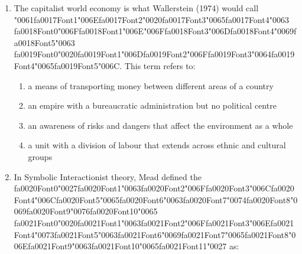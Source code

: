 \documentclass[12pt]{article}
\begin{document}
\begin{enumerate}[label=\arabic*.]
\begin{enumerate}[label=(\alph*)]
    \item absolute poverty
    \item relative poverty
    \item vertical mobility
    \item horizontal mobility
\end{enumerate}
\item The capitalist world economy is what Wallerstein (1974) would call {\char"0061}{\csname fa0017Font1\endcsname\char"006E}{\csname fa0017Font2\endcsname\char"0020}{\csname fa0017Font3\endcsname\char"0065}{\csname fa0017Font4\endcsname\char"0063} {\csname fa0018Font0\endcsname\char"006F}{\csname fa0018Font1\endcsname\char"006E}{\char"006F}{\csname fa0018Font3\endcsname\char"006D}{\csname fa0018Font4\endcsname\char"0069}{\csname fa0018Font5\endcsname\char"0063} {\csname fa0019Font0\endcsname\char"0020}{\csname fa0019Font1\endcsname\char"006D}{\csname fa0019Font2\endcsname\char"006F}{\csname fa0019Font3\endcsname\char"0064}{\csname fa0019Font4\endcsname\char"0065}{\csname fa0019Font5\endcsname\char"006C}. This term refers to:
\begin{enumerate}[label=(\alph*)]
    \item a means of transporting money between different areas of a country
    \item an empire with a bureaucratic administration but no political centre
    \item an awareness of risks and dangers that affect the environment as a whole
    \item a unit with a division of labour that extends across ethnic and cultural groups
\end{enumerate}
\item In Symbolic Interactionist theory, Mead defined the {\csname fa0020Font0\endcsname\char"0027}{\csname fa0020Font1\endcsname\char"0063}{\csname fa0020Font2\endcsname\char"006F}{\csname fa0020Font3\endcsname\char"006C}{\csname fa0020Font4\endcsname\char"006C}{\csname fa0020Font5\endcsname\char"0065}{\csname fa0020Font6\endcsname\char"0063}{\csname fa0020Font7\endcsname\char"0074}{\csname fa0020Font8\endcsname\char"0069}{\csname fa0020Font9\endcsname\char"0076}{\csname fa0020Font10\endcsname\char"0065} {\csname fa0021Font0\endcsname\char"0020}{\csname fa0021Font1\endcsname\char"0063}{\csname fa0021Font2\endcsname\char"006F}{\csname fa0021Font3\endcsname\char"006E}{\csname fa0021Font4\endcsname\char"0073}{\csname fa0021Font5\endcsname\char"0063}{\csname fa0021Font6\endcsname\char"0069}{\csname fa0021Font7\endcsname\char"0065}{\csname fa0021Font8\endcsname\char"006E}{\csname fa0021Font9\endcsname\char"0063}{\csname fa0021Font10\endcsname\char"0065}{\csname fa0021Font11\endcsname\char"0027} as:

\end{enumerate}
\end{document}
